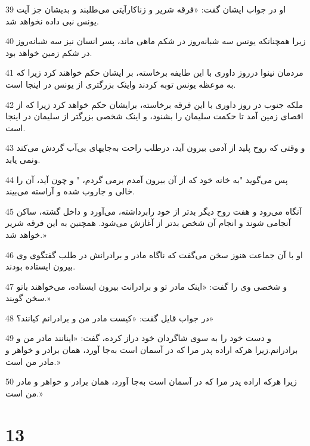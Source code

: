 \par 39 او در جواب ایشان گفت: «فرقه شریر و زناکارآیتی می‌طلبند و بدیشان جز آیت یونس نبی داده نخواهد شد.
\par 40 زیرا همچنانکه یونس سه شبانه‌روز در شکم ماهی ماند، پسر انسان نیز سه شبانه‌روز در شکم زمین خواهد بود.
\par 41 مردمان نینوا درروز داوری با این طایفه برخاسته، بر ایشان حکم خواهند کرد زیرا که به موعظه یونس توبه کردند واینک بزرگتری از یونس در اینجا است.
\par 42 ملکه جنوب در روز داوری با این فرقه برخاسته، برایشان حکم خواهد کرد زیرا که از اقصای زمین آمد تا حکمت سلیمان را بشنود، و اینک شخصی بزرگتر از سلیمان در اینجا است.
\par 43 و وقتی که روح پلید از آدمی بیرون آید، درطلب راحت به‌جایهای بی‌آب گردش می‌کند ونمی یابد.
\par 44 پس می‌گوید "به خانه خود که از آن بیرون آمدم برمی گردم، " و چون آید، آن را خالی و جاروب شده و آراسته می‌بیند.
\par 45 آنگاه می‌رود و هفت روح دیگر بدتر از خود رابرداشته، می‌آورد و داخل گشته، ساکن آنجامی شوند و انجام آن شخص بدتر از آغازش می‌شود. همچنین به این فرقه شریر خواهد شد.»
\par 46 او با آن جماعت هنوز سخن می‌گفت که ناگاه مادر و برادرانش در طلب گفتگوی وی بیرون ایستاده بودند.
\par 47 و شخصی وی را گفت: «اینک مادر تو و برادرانت بیرون ایستاده، می‌خواهند باتو سخن گویند.»
\par 48 در جواب قایل گفت: «کیست مادر من و برادرانم کیانند؟»
\par 49 و دست خود را به سوی شاگردان خود دراز کرده، گفت: «اینانند مادر من و برادرانم.زیرا هر‌که اراده پدر مرا که در آسمان است به‌جا آورد، همان برادر و خواهر و مادر من است.»
\par 50 زیرا هر‌که اراده پدر مرا که در آسمان است به‌جا آورد، همان برادر و خواهر و مادر من است.»

\chapter{13}

